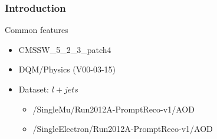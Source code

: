 \documentclass{beamer}
\begin{document}
\begin{frame}
\frametitle{Introduction}
Common features
\begin{itemize}
\item CMSSW\_5\_2\_3\_patch4
\item DQM/Physics  (V00-03-15)
\item Dataset: $l+jets$
\begin{itemize}
\item /SingleMu/Run2012A-PromptReco-v1/AOD
\item /SingleElectron/Run2012A-PromptReco-v1/AOD\\
\end{itemize}
\end{itemize}
\end{frame}





\end{document}
